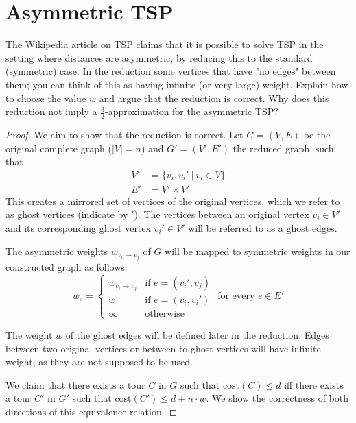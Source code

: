 \documentclass{article}
\begin{document}
\section{Asymmetric TSP}

The Wikipedia article on TSP claims that it is possible to solve TSP in the setting where distances are asymmetric, by reducing this to the standard (symmetric) case. In the reduction some vertices that have "no edges" between them; you can think of this as having infinite (or very large) weight. Explain how to choose the value $w$ and argue that the reduction is correct.  Why does this reduction not imply a $\frac{3}{2}$-approximation for the asymmetric TSP?

\begin{proof}
    We aim to show that the reduction is correct. Let $G=(V,E)$ be the original complete graph ($|V| = n$) and $G'=(V',E')$ the reduced graph, such that
    \begin{align*}
        V' &= \{v_i, v_i'\ |\ v_i \in V\}\\
        E' &= V' \times V'
    \end{align*}
    This creates a mirrored set of vertices of the original vertices, which we refer to as ghost vertices (indicate by $'$). The vertices between an original vertex $v_i \in V'$ and its corresponding ghost vertex $v_i' \in V'$ will be referred to as a ghost edges. 

    The asymmetric weights $w_{v_i \to v_j}$ of $G$ will be mapped to symmetric weights in our constructed graph as follows:
    \[
        w_e = \begin{cases}
            w_{v_i \to v_j} & \text{if }e = (v_i', v_j)\\
            w & \text{if }e = (v_i, v_i')\\
            \infty & \text{otherwise}
        \end{cases} \text{ for every } e \in E'
    \]

    The weight $w$ of the ghost edges will be defined later in the reduction. Edges between two original vertices or between to ghost vertices will have infinite weight, as they are not supposed to be used.
    
    
    We claim that there exists a tour $C$ in $G$ such that $\text{cost}(C) \le d$ iff there exists a tour $C'$ in $G'$ such that $\text{cost}(C') \le d + n \cdot w$. We show the correctness of both directions of this equivalence relation.


\end{proof}
\end{document}
